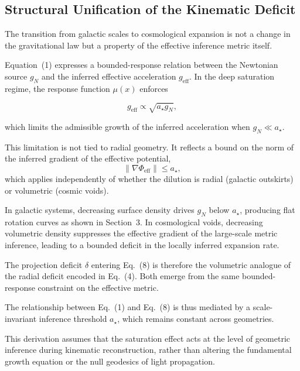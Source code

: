 \subsection{Structural Unification of the Kinematic Deficit}
  \label{subsec:structural-unification-of-the-kinematic-deficit}

  The transition from galactic scales to cosmological expansion is not a change in
  the gravitational law but a property of the effective inference metric itself.

  Equation~(1) expresses a bounded-response relation between the Newtonian source
  $g_N$ and the inferred effective acceleration $g_{\mathrm{eff}}$. In the deep
  saturation regime, the response function $\mu(x)$ enforces

  \[
    g_{\mathrm{eff}} \propto \sqrt{a_\star g_N},
  \]

  which limits the admissible growth of the inferred acceleration when
  $g_N \ll a_\star$.

  This limitation is not tied to radial geometry.
  It reflects a bound on the norm of the inferred gradient of the effective potential,
  \[
    \|\nabla \Phi_{\mathrm{eff}}\| \leq a_\star,
  \]
  which applies independently of whether the dilution is radial
  (galactic outskirts) or volumetric (cosmic voids).

  In galactic systems, decreasing surface density drives $g_N$ below $a_\star$,
  producing flat rotation curves as shown in Section~3.
  In cosmological voids, decreasing volumetric density suppresses the effective
  gradient of the large-scale metric inference, leading to a bounded deficit in
  the locally inferred expansion rate.

  The projection deficit $\delta$ entering Eq.~(8) is therefore the volumetric
  analogue of the radial deficit encoded in Eq.~(4).
  Both emerge from the same bounded-response constraint on the effective metric.

  The relationship between Eq.~(1) and Eq.~(8) is thus mediated by a scale-invariant
  inference threshold $a_\star$, which remains constant across geometries.

  This derivation assumes that the saturation effect acts at the level of geometric inference during kinematic
  reconstruction, rather than altering the fundamental growth equation or the null geodesics of light propagation.
